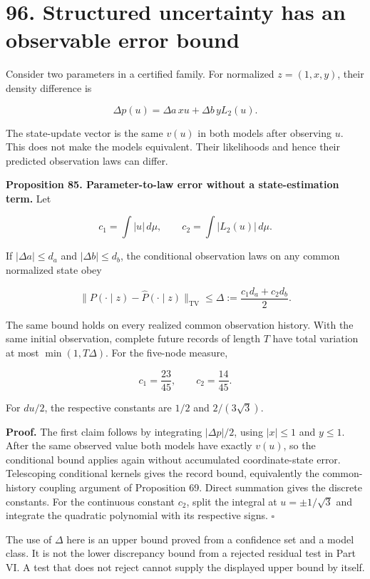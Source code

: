 \documentclass[11pt,letterpaper]{article}
\begin{document}
\newpage

\section{96. Structured uncertainty has an observable error
bound}\label{structured-uncertainty-has-an-observable-error-bound}

Consider two parameters in a certified family. For normalized
\(z=(1,x,y)\), their density difference is

\[
\Delta p(u)=\Delta a\,x u+\Delta b\,yL_2(u).
\]

The state-update vector is the same \(v(u)\) in both models after
observing \(u\). This does not make the models equivalent. Their
likelihoods and hence their predicted observation laws can differ.

\textbf{Proposition 85. Parameter-to-law error without a
state-estimation term.} Let

\[
c_1=\int|u|\,d\mu,
\qquad c_2=\int|L_2(u)|\,d\mu.
\]

If \(|\Delta a|\leq d_a\) and \(|\Delta b|\leq d_b\), the conditional
observation laws on any common normalized state obey

\[
\boxed{
\|P(\cdot\mid z)-\widehat P(\cdot\mid z)\|_{\mathrm{TV}}
\leq\Delta:=\frac{c_1d_a+c_2d_b}{2}.
}
\]

The same bound holds on every realized common observation history. With
the same initial observation, complete future records of length \(T\)
have total variation at most \(\min(1,T\Delta)\). For the five-node
measure,

\[
c_1=\frac{23}{45},\qquad c_2=\frac{14}{45}.
\]

For \(du/2\), the respective constants are \(1/2\) and \(2/(3\sqrt3)\).

\textbf{Proof.} The first claim follows by integrating \(|\Delta p|/2\),
using \(|x|\leq1\) and \(y\leq1\). After the same observed value both
models have exactly \(v(u)\), so the conditional bound applies again
without accumulated coordinate-state error. Telescoping conditional
kernels gives the record bound, equivalently the common-history coupling
argument of Proposition 69. Direct summation gives the discrete
constants. For the continuous constant \(c_2\), split the integral at
\(u=\pm1/\sqrt3\) and integrate the quadratic polynomial with its
respective signs. \(\square\)

The use of \(\Delta\) here is an upper bound proved from a confidence
set and a model class. It is not the lower discrepancy bound from a
rejected residual test in Part VI. A test that does not reject cannot
supply the displayed upper bound by itself.
\end{document}
